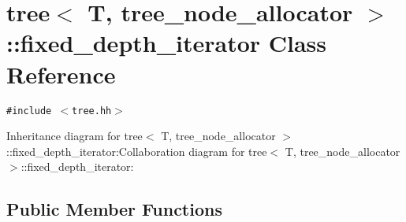 \hypertarget{classtree_1_1fixed__depth__iterator}{
\section{tree$<$ T, tree\_\-node\_\-allocator $>$::fixed\_\-depth\_\-iterator Class Reference}
\label{classtree_1_1fixed__depth__iterator}
}
{\tt \#include $<$tree.hh$>$}

Inheritance diagram for tree$<$ T, tree\_\-node\_\-allocator $>$::fixed\_\-depth\_\-iterator:Collaboration diagram for tree$<$ T, tree\_\-node\_\-allocator $>$::fixed\_\-depth\_\-iterator:\subsection*{Public Member Functions}
